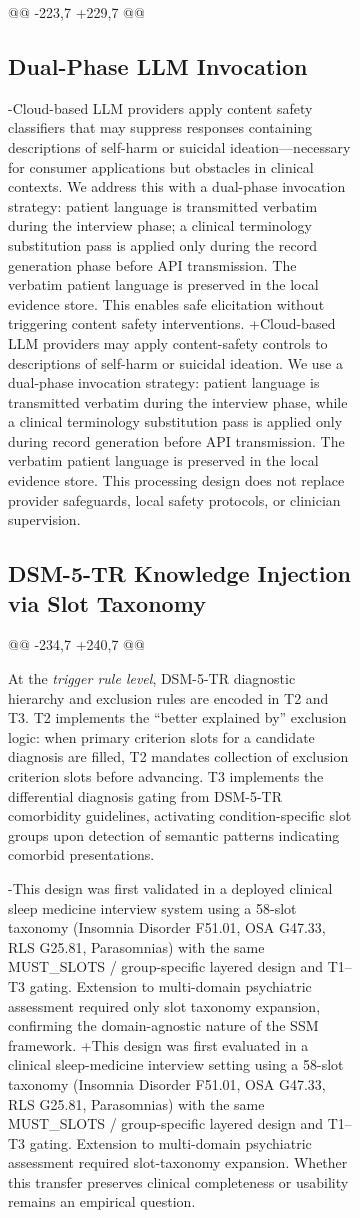 \begin{figure}[t]
{\begin{figure}[!t]
{@@ -223,7 +229,7 @@
 
 \subsection{Dual-Phase LLM Invocation}
 
-Cloud-based LLM providers apply content safety classifiers that may suppress responses containing descriptions of self-harm or suicidal ideation---necessary for consumer applications but obstacles in clinical contexts. We address this with a dual-phase invocation strategy: patient language is transmitted verbatim during the interview phase; a clinical terminology substitution pass is applied only during the record generation phase before API transmission. The verbatim patient language is preserved in the local evidence store. This enables safe elicitation without triggering content safety interventions.
+Cloud-based LLM providers may apply content-safety controls to descriptions of self-harm or suicidal ideation. We use a dual-phase invocation strategy: patient language is transmitted verbatim during the interview phase, while a clinical terminology substitution pass is applied only during record generation before API transmission. The verbatim patient language is preserved in the local evidence store. This processing design does not replace provider safeguards, local safety protocols, or clinician supervision.
 
 \subsection{DSM-5-TR Knowledge Injection via Slot Taxonomy}
 \label{sec:dsm_injection}
@@ -234,7 +240,7 @@
 
 At the \textit{trigger rule level}, DSM-5-TR diagnostic hierarchy and exclusion rules are encoded in T2 and T3. T2 implements the ``better explained by'' exclusion logic: when primary criterion slots for a candidate diagnosis are filled, T2 mandates collection of exclusion criterion slots before advancing. T3 implements the differential diagnosis gating from DSM-5-TR comorbidity guidelines, activating condition-specific slot groups upon detection of semantic patterns indicating comorbid presentations.
 
-This design was first validated in a deployed clinical sleep medicine interview system using a 58-slot taxonomy (Insomnia Disorder F51.01, OSA G47.33, RLS G25.81, Parasomnias) with the same MUST\_SLOTS / group-specific layered design and T1--T3 gating. Extension to multi-domain psychiatric assessment required only slot taxonomy expansion, confirming the domain-agnostic nature of the SSM framework.
+This design was first evaluated in a clinical sleep-medicine interview setting using a 58-slot taxonomy (Insomnia Disorder F51.01, OSA G47.33, RLS G25.81, Parasomnias) with the same MUST\_SLOTS / group-specific layered design and T1--T3 gating. Extension to multi-domain psychiatric assessment required slot-taxonomy expansion. Whether this transfer preserves clinical completeness or usability remains an empirical question.
 
}
\end{figure}}
\end{figure}
